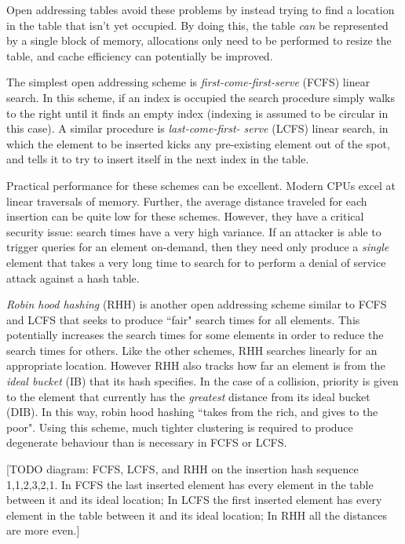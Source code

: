 \documentclass{cccg13}
\begin{document}
Open addressing tables avoid these problems by instead trying to find a
location in the table that isn't yet occupied. By doing this, the table
\emph{can} be represented by a single block of memory, allocations only need
to be performed to resize the table, and cache efficiency can potentially be
improved.

The simplest open addressing scheme is \emph{first-come-first-serve} (FCFS)
linear search. In this scheme, if an index is occupied the search procedure
simply walks to the right until it finds an empty index (indexing is assumed
to be circular in this case). A similar procedure is \emph{last-come-first-
serve} (LCFS) linear search, in which the element to be inserted kicks any
pre-existing element out of the spot, and tells it to try to insert itself in
the next index in the table.

Practical performance for these schemes can be excellent. Modern CPUs excel at
linear traversals of memory. Further, the average distance traveled for each
insertion can be quite low for these schemes. However, they have a critical
security issue: search times have a very high variance. If an attacker is able
to trigger queries for an element on-demand, then they need only produce a
\emph{single} element that takes a very long time to search for to perform a
denial of service attack against a hash table.

\emph{Robin hood hashing} (RHH) is another open addressing scheme similar to
FCFS and LCFS that seeks to produce ``fair" search times for all elements.
This potentially increases the search times for some elements in order to
reduce the search times for others. Like the other schemes, RHH searches
linearly for an appropriate location. However RHH also tracks how far an
element is from the \emph{ideal bucket} (IB) that its hash specifies. In the
case of a collision, priority is given to the element that currently has the
\emph{greatest} distance from its ideal bucket (DIB). In this way, robin hood
hashing ``takes from the rich, and gives to the poor". Using this scheme, much
tighter clustering is required to produce degenerate behaviour than is
necessary in FCFS or LCFS.

[TODO diagram: FCFS, LCFS, and RHH on the insertion hash sequence 1,1,2,3,2,1.
In FCFS the last inserted element has every element in the table between it
and its ideal location; In LCFS the first inserted element has every element
in the table between it and its ideal location; In RHH all the distances are
more even.]
\end{document}
